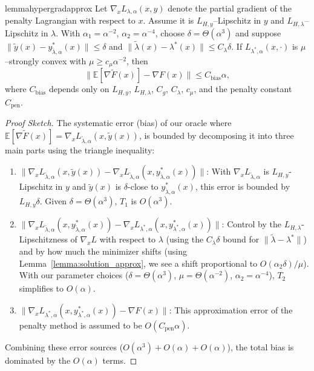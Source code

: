 \documentclass[letterpaper]{article} %
\newcommand{\1}{\mathbf{1}}
\begin{document}
\begin{restatable}{lemma}{hypergradapprox}
\label{lemma:bias_bound}
Let $\nabla_x L_{\lambda,\alpha}(x,y)$ denote the partial gradient of the penalty Lagrangian with respect to $x$. Assume it is $L_{H,y}$–Lipschitz in $y$ and $L_{H,\lambda}$–Lipschitz in $\lambda$.
With $\alpha_1=\alpha^{-2}$, $\alpha_2=\alpha^{-4}$, choose
$\delta=\Theta(\alpha^{3})$ and suppose
$\|\tilde{y}(x)-y^*_{\tilde{\lambda},\alpha}(x)\|\le\delta$ and
$\|\tilde{\lambda}(x)-\lambda^*(x)\|\le C_\lambda\delta$.
If $L_{\lambda^*,\alpha}(x,\cdot)$ is $\mu$–strongly convex with
$\mu\ge c_\mu\alpha^{-2}$, then
\[
\| \mathbb{E}[\nabla\tilde{F}(x)] - \nabla F(x) \| \le C_{\text{bias}}\alpha,
\]
where $C_{\text{bias}}$ depends only on $L_{H,y}$, $L_{H,\lambda}$, $C_g$, $C_\lambda$, $c_\mu$, and the penalty constant $C_{\text{pen}}$.
\end{restatable}

\begin{proof}[Proof Sketch]
The systematic error (bias) of our oracle where $\mathbb{E}[\nabla\tilde{F}(x)] = \nabla_x L_{\tilde{\lambda},\alpha}(x, \tilde{y}(x))$, is bounded by decomposing it into three main parts using the triangle inequality:

\begin{enumerate}
    \item $\|\nabla_x L_{\tilde{\lambda},\alpha}(x, \tilde{y}(x)) - \nabla_x L_{\tilde{\lambda},\alpha}(x, y^*_{\tilde{\lambda},\alpha}(x))\|$: With $\nabla_x L_{\tilde{\lambda},\alpha}$ is $L_{H,y}$-Lipschitz in $y$ and $\tilde{y}(x)$ is $\delta$-close to $y^*_{\tilde{\lambda},\alpha}(x)$, this error is bounded by $L_{H,y}\delta$. Given $\delta=\Theta(\alpha^3)$, $T_1$ is $O(\alpha^3)$.

    \item $\|\nabla_x L_{\tilde{\lambda},\alpha}(x, y^*_{\tilde{\lambda},\alpha}(x)) - \nabla_x L_{\lambda^*,\alpha}(x, y^*_{\lambda^*,\alpha}(x))\|$: Control by the $L_{H,\lambda}$-Lipschitzness of $\nabla_x L$ with respect to $\lambda$ (using the $C_\lambda\delta$ bound for $\|\tilde{\lambda}-\lambda^*\|$) and by how much the minimizer shifts (using Lemma~\ref{lemma:solution_approx}, we see a shift proportional to $O(\alpha_2\delta)/\mu$). With our parameter choices ($\delta=\Theta(\alpha^3)$, $\mu=\Theta(\alpha^{-2})$, $\alpha_2=\alpha^{-4}$), $T_2$ simplifies to $O(\alpha)$.

    \item $\|\nabla_x L_{\lambda^*,\alpha}(x, y^*_{\lambda^*,\alpha}(x)) - \nabla F(x)\|$: This approximation error of the penalty method is assumed to be $O(C_{\text{pen}}\alpha)$.
\end{enumerate}
Combining these error sources ($O(\alpha^3) + O(\alpha) + O(\alpha)$), the total bias is dominated by the $O(\alpha)$ terms.
\end{proof}
\end{document}
